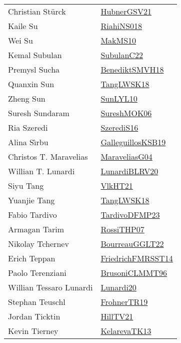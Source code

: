 {\begin{longtable}{p{4cm}p{20cm}}
Christian St{\"{u}}rck & \href{articles/HubnerGSV21.pdf}{HubnerGSV21}\cite{HubnerGSV21} \\
Kaile Su & \href{papers/RiahiNS018.pdf}{RiahiNS018}\cite{RiahiNS018} \\
Wei Su & \href{papers/MakMS10.pdf}{MakMS10}\cite{MakMS10} \\
Kemal Subulan & \href{articles/SubulanC22.pdf}{SubulanC22}\cite{SubulanC22} \\
Premysl Sucha & \href{papers/BenediktSMVH18.pdf}{BenediktSMVH18}\cite{BenediktSMVH18} \\
Quanxin Sun & \href{}{TangLWSK18}\cite{TangLWSK18} \\
Zheng Sun & \href{papers/SunLYL10.pdf}{SunLYL10}\cite{SunLYL10} \\
Suresh Sundaram & \href{}{SureshMOK06}\cite{SureshMOK06} \\
Ria Szeredi & \href{papers/SzerediS16.pdf}{SzerediS16}\cite{SzerediS16} \\
Alina S{\^{\i}}rbu & \href{papers/GalleguillosKSB19.pdf}{GalleguillosKSB19}\cite{GalleguillosKSB19} \\
Christos T. Maravelias & \href{papers/MaraveliasG04.pdf}{MaraveliasG04}\cite{MaraveliasG04} \\
Willian T. Lunardi & \href{articles/LunardiBLRV20.pdf}{LunardiBLRV20}\cite{LunardiBLRV20} \\
Siyu Tang & \href{articles/VlkHT21.pdf}{VlkHT21}\cite{VlkHT21} \\
Yuanjie Tang & \href{}{TangLWSK18}\cite{TangLWSK18} \\
Fabio Tardivo & \href{papers/TardivoDFMP23.pdf}{TardivoDFMP23}\cite{TardivoDFMP23} \\
Armagan Tarim & \href{papers/RossiTHP07.pdf}{RossiTHP07}\cite{RossiTHP07} \\
Nikolay Tchernev & \href{articles/BourreauGGLT22.pdf}{BourreauGGLT22}\cite{BourreauGGLT22} \\
Erich Teppan & \href{}{FriedrichFMRSST14}\cite{FriedrichFMRSST14} \\
Paolo Terenziani & \href{papers/BrusoniCLMMT96.pdf}{BrusoniCLMMT96}\cite{BrusoniCLMMT96} \\
Willian Tessaro Lunardi & \href{}{Lunardi20}\cite{Lunardi20} \\
Stephan Teuschl & \href{papers/FrohnerTR19.pdf}{FrohnerTR19}\cite{FrohnerTR19} \\
Jordan Ticktin & \href{papers/HillTV21.pdf}{HillTV21}\cite{HillTV21} \\
Kevin Tierney & \href{papers/KelarevaTK13.pdf}{KelarevaTK13}\cite{KelarevaTK13} \\

\end{longtable}}
